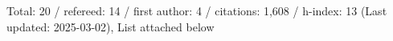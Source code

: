 Total: 20 / refereed: 14 / first author: 4 / citations: 1,608 / h-index: 13 (Last updated: 2025-03-02), List attached below